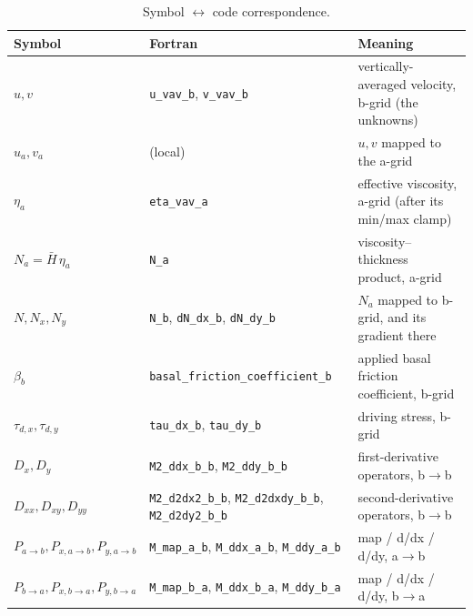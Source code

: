 \documentclass[11pt]{article}
\newcommand{\code}[1]{\texttt{#1}}
\begin{document}
\begin{table}[h]
\centering
\small
\begin{tabular}{@{}lp{5.0cm}p{5.9cm}@{}}
\toprule
Symbol & Fortran & Meaning \\
\midrule
$u,v$ & \code{u\_\allowbreak vav\_\allowbreak b}, \code{v\_\allowbreak vav\_\allowbreak b} & vertically-averaged velocity, b-grid (the unknowns) \\
$u_a,v_a$ & (local) & $u,v$ mapped to the a-grid \\
$\eta_a$ & \code{eta\_\allowbreak vav\_\allowbreak a} & effective viscosity, a-grid (after its min/max clamp) \\
$N_a = \bar H\,\eta_a$ & \code{N\_\allowbreak a} & viscosity--thickness product, a-grid \\
$N, N_x, N_y$ & \code{N\_\allowbreak b}, \code{dN\_\allowbreak dx\_\allowbreak b}, \code{dN\_\allowbreak dy\_\allowbreak b} & $N_a$ mapped to b-grid, and its gradient there \\
$\beta_b$ & \code{basal\_\allowbreak friction\_\allowbreak coefficient\_\allowbreak b} & applied basal friction coefficient, b-grid \\
$\tau_{d,x},\tau_{d,y}$ & \code{tau\_\allowbreak dx\_\allowbreak b}, \code{tau\_\allowbreak dy\_\allowbreak b} & driving stress, b-grid \\
$D_x, D_y$ & \code{M2\_\allowbreak ddx\_\allowbreak b\_\allowbreak b}, \code{M2\_\allowbreak ddy\_\allowbreak b\_\allowbreak b} & first-derivative operators, b$\to$b \\
$D_{xx}, D_{xy}, D_{yy}$ & \code{M2\_\allowbreak d2dx2\_\allowbreak b\_\allowbreak b}, \code{M2\_\allowbreak d2dxdy\_\allowbreak b\_\allowbreak b}, \code{M2\_\allowbreak d2dy2\_\allowbreak b\_\allowbreak b} & second-derivative operators, b$\to$b \\
$P_{a\to b}, P_{x,a\to b}, P_{y,a\to b}$ & \code{M\_\allowbreak map\_\allowbreak a\_\allowbreak b}, \code{M\_\allowbreak ddx\_\allowbreak a\_\allowbreak b}, \code{M\_\allowbreak ddy\_\allowbreak a\_\allowbreak b} & map / d/dx / d/dy, a$\to$b \\
$P_{b\to a}, P_{x,b\to a}, P_{y,b\to a}$ & \code{M\_\allowbreak map\_\allowbreak b\_\allowbreak a}, \code{M\_\allowbreak ddx\_\allowbreak b\_\allowbreak a}, \code{M\_\allowbreak ddy\_\allowbreak b\_\allowbreak a} & map / d/dx / d/dy, b$\to$a \\
\bottomrule
\end{tabular}
\caption{Symbol $\leftrightarrow$ code correspondence.}
\label{tab:notation}
\end{table}
\end{document}
